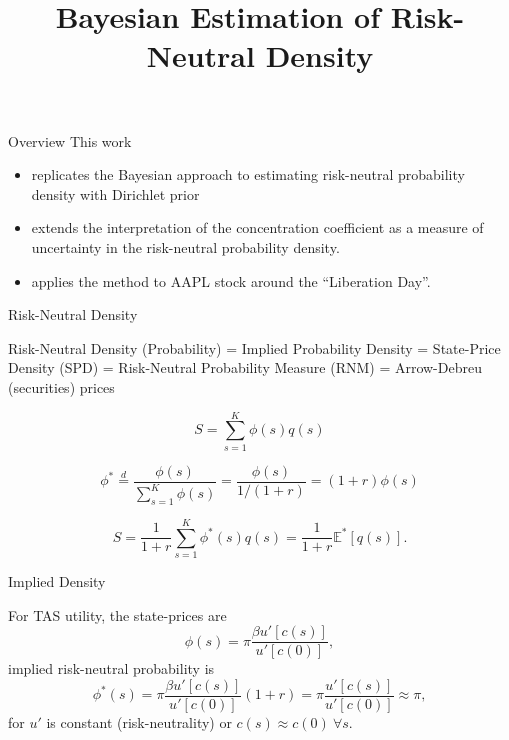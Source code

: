 \documentclass[10pt,aspectratio=43]{beamer}
\title{Bayesian Estimation of Risk-Neutral Density}
\begin{document}
\begin{frame}[fragile]
    \titlepage
\end{frame}




\begin{frame}{Overview}
    This work\vspace{-3ex}
    \begin{itemize}\setlength{\itemsep}{2ex}
        \item replicates the Bayesian approach to estimating risk-neutral probability density with Dirichlet prior {\footnotesize\parencite{fisherSimplexRegression2016,hardleStatePriceDensities2015}}
        \item extends the interpretation of the concentration coefficient as a measure of uncertainty in the risk-neutral probability density.
        \item applies the method to AAPL stock around the ``Liberation Day''.
    \end{itemize}
\end{frame}

\begin{frame}{ Risk-Neutral Density}

Risk-Neutral Density (Probability) = Implied Probability Density = State-Price Density (SPD) = Risk-Neutral Probability Measure (RNM) = Arrow-Debreu (securities) prices

    \[S=\sum_{s=1}^K\phi(s)q(s)\]

    

    \[\phi^*\overset{d}{=}\frac{\phi(s)}{\sum_{s=1}^K\phi(s)}=\frac{\phi(s)}{1/(1+r)}=(1+r)\phi(s)\]

    \[S=\frac{1}{1+r}\sum_{s=1}^K\phi^*(s)q(s)=\frac{1}{1+r}\mathbb{E}^*[q(s)].\]

\end{frame}



\begin{frame}{Implied  Density}
 
    For TAS utility, the state-prices are 
    \[\phi(s)=\pi\frac{\beta u'[c(s)]}{u'[c(0)]},\]
    \then implied risk-neutral probability is
    \[\phi^*(s)=\pi\frac{\beta u'[c(s)]}{u'[c(0)]}(1+r)= \pi\frac{u'[c(s)]}{u'[c(0)]}\approx \pi,\]
    for $u'$ is constant (risk-neutrality) or $c(s)\approx c(0)~\forall s$.


\end{frame}
\end{document}
